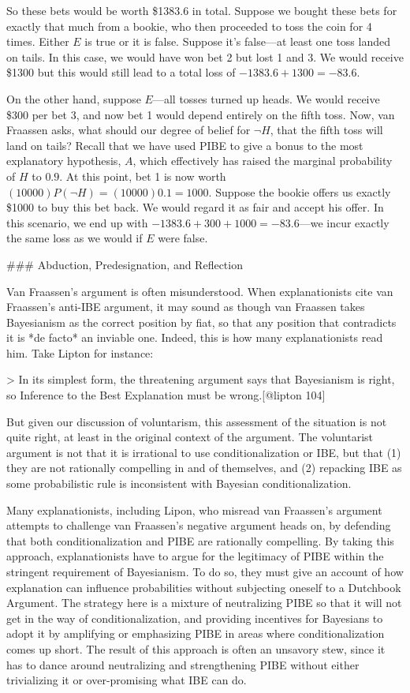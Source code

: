 So these bets would be worth \$1383.6 in total. Suppose we bought these
bets for exactly that much from a bookie, who then proceeded to toss the
coin for 4 times. Either \(E\) is true or it is false. Suppose it's
false---at least one toss landed on tails. In this case, we would have
won bet 2 but lost 1 and 3. We would receive \$1300 but this would still
lead to a total loss of \(-1383.6+1300=-83.6\).

On the other hand, suppose \(E\)---all tosses turned up heads. We would
receive \$300 per bet 3, and now bet 1 would depend entirely on the
fifth toss. Now, van Fraassen asks, what should our degree of belief for
\(\neg H\), that the fifth toss will land on tails? Recall that we have
used PIBE to give a bonus to the most explanatory hypothesis, \(A\),
which effectively has raised the marginal probability of \(H\) to
\(0.9\). At this point, bet 1 is now worth
\((10000)P(\neg H) = (10000)0.1 = 1000\). Suppose the bookie offers us
exactly \$1000 to buy this bet back. We would regard it as fair and
accept his offer. In this scenario, we end up with
\(-1383.6+300+1000 = -83.6\)---we incur exactly the same loss as we
would if \(E\) were false.

\#\#\# Abduction, Predesignation, and Reflection

Van Fraassen's argument is often misunderstood. When explanationists
cite van Fraassen's anti-IBE argument, it may sound as though van
Fraassen takes Bayesianism as the correct position by fiat, so that any
position that contradicts it is *de facto* an inviable one. Indeed, this
is how many explanationists read him. Take Lipton for instance:

\textgreater{} In its simplest form, the threatening argument says that
Bayesianism is right, so Inference to the Best Explanation must be
wrong.{[}@lipton 104{]}

But given our discussion of voluntarism, this assessment of the
situation is not quite right, at least in the original context of the
argument. The voluntarist argument is not that it is irrational to use
conditionalization or IBE, but that (1) they are not rationally
compelling in and of themselves, and (2) repacking IBE as some
probabilistic rule is inconsistent with Bayesian conditionalization.

Many explanationists, including Lipon, who misread van Fraassen's
argument attempts to challenge van Fraassen's negative argument heads
on, by defending that both conditionalization and PIBE are rationally
compelling. By taking this approach, explanationists have to argue for
the legitimacy of PIBE within the stringent requirement of Bayesianism.
To do so, they must give an account of how explanation can influence
probabilities without subjecting oneself to a Dutchbook Argument. The
strategy here is a mixture of neutralizing PIBE so that it will not get
in the way of conditionalization, and providing incentives for Bayesians
to adopt it by amplifying or emphasizing PIBE in areas where
conditionalization comes up short. The result of this approach is often
an unsavory stew, since it has to dance around neutralizing and
strengthening PIBE without either trivializing it or over-promising what
IBE can do.

